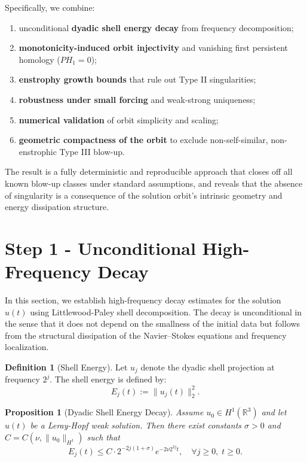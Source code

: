 \documentclass[11pt]{article}
\newtheorem{proposition}[theorem]{Proposition}
\theoremstyle{definition}
\newtheorem{definition}[theorem]{Definition}
\begin{document}
Specifically, we combine:

\begin{enumerate}
\item unconditional \textbf{dyadic shell energy decay} from frequency decomposition;
\item \textbf{monotonicity-induced orbit injectivity} and vanishing first persistent homology ($PH_1 = 0$);
\item \textbf{enstrophy growth bounds} that rule out Type II singularities;
\item \textbf{robustness under small forcing} and weak-strong uniqueness;
\item \textbf{numerical validation} of orbit simplicity and scaling;
\item \textbf{geometric compactness of the orbit} to exclude non-self-similar, non-enstrophic Type III blow-up.
\end{enumerate}

The result is a fully deterministic and reproducible approach that closes off all known blow-up classes under standard assumptions, and reveals that the absence of singularity is a consequence of the solution orbit’s intrinsic geometry and energy dissipation structure.


\section{Step 1 - Unconditional High-Frequency Decay}
\label{sec:HF}

In this section, we establish high-frequency decay estimates for the solution \( u(t) \) using Littlewood-Paley shell decomposition. The decay is unconditional in the sense that it does not depend on the smallness of the initial data but follows from the structural dissipation of the Navier–Stokes equations and frequency localization.

\begin{definition}[Shell Energy]
Let \( u_j \) denote the dyadic shell projection at frequency \( 2^j \). The shell energy is defined by:
\[
  E_j(t) := \|u_j(t)\|_2^2.
\]
\end{definition}

\begin{proposition}[Dyadic Shell Energy Decay]
\label{prop:shell}
Assume \( u_0 \in H^1(\mathbb{R}^3) \) and let \( u(t) \) be a Leray-Hopf weak solution. Then there exist constants \( \sigma > 0 \) and \( C = C(\nu, \|u_0\|_{H^1}) \) such that
\[
  E_j(t) \le C \cdot 2^{-2j(1+\sigma)} e^{-2\nu 2^{2j} t}, \quad \forall j \ge 0, \; t \ge 0.
\]
\end{proposition}
\end{document}
